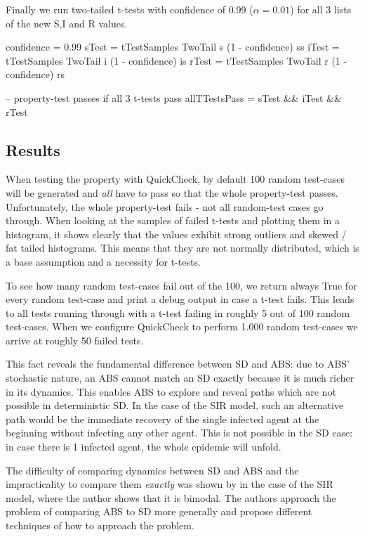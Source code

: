 Finally we run two-tailed t-tests with confidence of 0.99 ($\alpha = 0.01$) for all 3 lists of the new S,I and R values.

\begin{HaskellCode}
confidence = 0.99
sTest = tTestSamples TwoTail s (1 - confidence) ss
iTest = tTestSamples TwoTail i (1 - confidence) is
rTest = tTestSamples TwoTail r (1 - confidence) rs

-- property-test passes if all 3 t-tests pass
allTTestsPass = sTest && iTest && rTest
\end{HaskellCode}

\subsection{Results}
When testing the property with QuickCheck, by default 100 random test-cases will be generated and \textit{all} have to pass so that the whole property-test passes. Unfortunately, the whole property-test fails - not all random-test cases go through. When looking at the samples of failed t-tests and plotting them in a histogram, it shows clearly that the values exhibit strong outliers and skewed / fat tailed histograms. This means that they are not normally distributed, which is a base assumption and a necessity for t-tests. 

To see how many random test-cases fail out of the 100, we return always True for every random test-case and print a debug output in case a t-test fails. This leads to all tests running through with a t-test failing in roughly 5 out of 100 random test-cases. When we configure QuickCheck to perform 1.000 random test-cases we arrive at roughly 50 failed tests. %

This fact reveals the fundamental difference between SD and ABS: due to ABS' stochastic nature, an ABS cannot match an SD exactly because it is much richer in its dynamics. This enables ABS to explore and reveal paths which are not possible in deterministic SD. In the case of the SIR model, such an alternative path would be the immediate recovery of the single infected agent at the beginning without infecting any other agent. This is not possible in the SD case: in case there is 1 infected agent, the whole epidemic will unfold.

The difficulty of comparing dynamics between SD and ABS and the impracticality to compare them \textit{exactly} was shown by \cite{macal_agent-based_2010} in the case of the SIR model, where the author shows that it is bimodal. The authors \cite{figueredo_comparing_2014} approach the problem of comparing ABS to SD more generally and propose different techniques of how to approach the problem.

